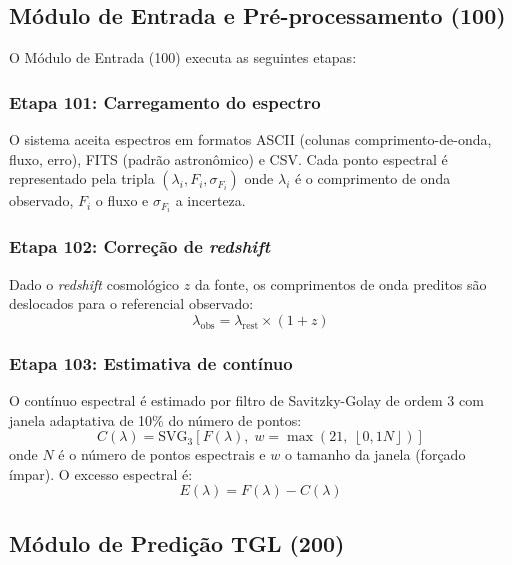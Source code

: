 \documentclass[12pt,a4paper]{article}
\begin{document}
\subsection{Módulo de Entrada e Pré-processamento (100)}

O Módulo de Entrada (100) executa as seguintes etapas:

\subsubsection{Etapa 101: Carregamento do espectro}

O sistema aceita espectros em formatos ASCII (colunas
comprimento-de-onda, fluxo, erro), FITS (padrão astronômico)
e CSV. Cada ponto espectral é representado pela tripla
$(\lambda_i, F_i, \sigma_{F_i})$ onde $\lambda_i$ é o
comprimento de onda observado, $F_i$ o fluxo e $\sigma_{F_i}$
a incerteza.

\subsubsection{Etapa 102: Correção de \textit{redshift}}

Dado o \textit{redshift} cosmológico $z$ da fonte, os
comprimentos de onda preditos são deslocados para o referencial
observado:
\begin{equation}
\lambda_{\text{obs}} = \lambda_{\text{rest}} \times (1 + z)
\label{eq:redshift}
\end{equation}

\subsubsection{Etapa 103: Estimativa de contínuo}

O contínuo espectral é estimado por filtro de Savitzky-Golay de
ordem 3 com janela adaptativa de 10\% do número de pontos:
\begin{equation}
C(\lambda) = \text{SVG}_3\left[F(\lambda),\;
  w = \max\left(21,\; \left\lfloor 0{,}1 N \right\rfloor
  \right)\right]
\label{eq:continuo}
\end{equation}
onde $N$ é o número de pontos espectrais e $w$ o tamanho da
janela (forçado ímpar). O excesso espectral é:
\begin{equation}
E(\lambda) = F(\lambda) - C(\lambda)
\label{eq:excesso}
\end{equation}

\subsection{Módulo de Predição TGL (200)}
\end{document}
